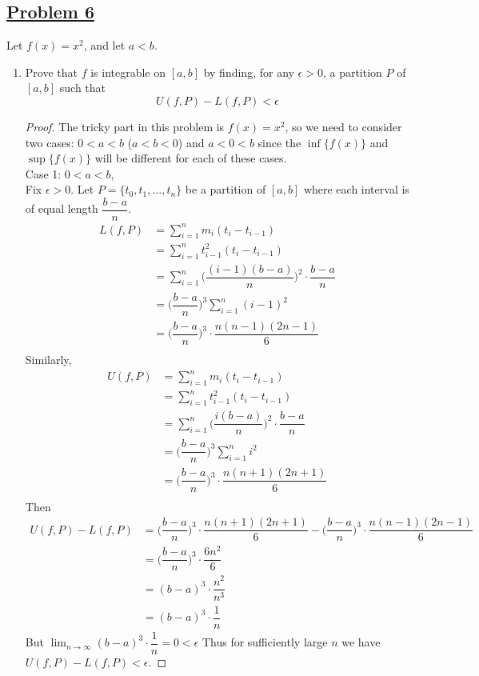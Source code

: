 \documentclass[10pt,letterpaper]{article}
\begin{document}
	\subsection*{{\color{purple}\underline{Problem 6}}}
	Let $f(x) = x^2$, and let $a < b$.
	\begin{enumerate}
		\item Prove that $f$ is integrable on $[a, b]$ by finding, for any $\epsilon > 0$, a
		partition $P$ of $[a, b]$ such that $$U(f, P) - L(f, P) < \epsilon$$
		\begin{proof}
	The tricky part in this problem is $f(x) = x^2$, so we need to consider two cases:
	$0 < a < b$ ($a < b < 0$) and $a < 0 < b$ since the $\inf\{f(x)\}$ and $\sup\{f(x)\}$ will 
	be different for each of these cases. \\
	
	Case 1: $0 < a < b$, \\
	Fix $\epsilon > 0$. Let $P = \{t_0, t_1, \ldots, t_n\}$ be a partition of $[a, b]$ where
	each interval is of equal length $\dfrac{b - a}{n}$. 
\begin{align*}
	L(f, P) &= \displaystyle\sum_{i=1}^{n} m_i(t_i - t_{i-1}) \\
	&= \displaystyle\sum_{i=1}^{n} t_{i-1}^2(t_i - t_{i-1}) \\
	&= \displaystyle\sum_{i=1}^{n} \bigg(\dfrac{(i - 1)(b - a)}{n}\bigg)^2 \cdot \dfrac{b - a}{n} \\
	&= \bigg(\dfrac{b - a}{n}\bigg)^3 \displaystyle\sum_{i=1}^{n} (i - 1)^2 \\
	&= \bigg(\dfrac{b - a}{n}\bigg)^3 \cdot \dfrac{n(n - 1)(2n - 1)}{6} \\
\end{align*}
	Similarly,
\begin{align*}
	U(f, P) &= \displaystyle\sum_{i=1}^{n} m_i(t_i - t_{i-1}) \\
	&= \displaystyle\sum_{i=1}^{n} t_{i-1}^2(t_i - t_{i-1}) \\
	&= \displaystyle\sum_{i=1}^{n} \bigg(\dfrac{i(b - a)}{n}\bigg)^2 \cdot \dfrac{b - a}{n} \\
	&= \bigg(\dfrac{b - a}{n}\bigg)^3 \displaystyle\sum_{i=1}^{n} i^2 \\
	&= \bigg(\dfrac{b - a}{n}\bigg)^3 \cdot \dfrac{n(n + 1)(2n + 1)}{6} \\
\end{align*}
	Then
\begin{align*}
	U(f, P) - L(f, P) 
&=
	\bigg(\dfrac{b - a}{n}\bigg)^3 \cdot \dfrac{n(n + 1)(2n + 1)}{6} - 
	\bigg(\dfrac{b - a}{n}\bigg)^3 \cdot \dfrac{n(n - 1)(2n - 1)}{6} \\
&= 
	\bigg(\dfrac{b - a}{n}\bigg)^3 \cdot \dfrac{6n^2}{6} \\
&= (b - a)^3 \cdot \dfrac{n^2}{n^3} \\
&= (b - a)^3 \cdot \dfrac{1}{n}
\end{align*}
	But $\displaystyle\lim_{n\to \infty} (b - a)^3 \cdot \dfrac{1}{n} = 0 < \epsilon$
	Thus for sufficiently large $n$ we have $U(f, P) - L(f, P) < \epsilon$. 
	

\end{proof}
\end{enumerate}
\end{document}
